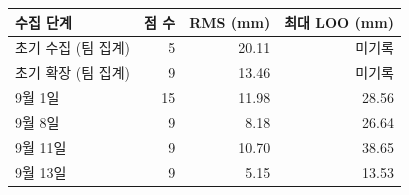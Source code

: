 \begin{tabular}{@{}lrrr@{}}
\toprule 수집 단계 & 점 수 & RMS (mm) & 최대 LOO (mm) \\
\midrule
초기 수집 (팀 집계) & 5 & 20.11 & 미기록 \\
초기 확장 (팀 집계) & 9 & 13.46 & 미기록 \\
9월 1일 & 15 & 11.98 & 28.56 \\
9월 8일 & 9 & 8.18 & 26.64 \\
9월 11일 & 9 & 10.70 & 38.65 \\
9월 13일 & 9 & 5.15 & 13.53 \\
\bottomrule
\end{tabular}

